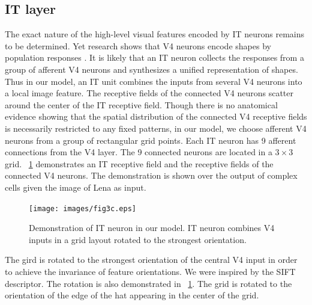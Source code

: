 \documentclass[5p]{elsarticle}
\begin{document}
\subsection{IT layer}

The exact nature of the high-level visual features 
encoded by IT neurons remains to be determined.
Yet research shows that V4 neurons encode shapes 
by population responses \cite{Pasupathy2002}.
It is likely that an IT neuron collects 
the responses from a group of afferent V4 neurons 
and synthesizes a unified representation of shapes.
Thus in our model,
an IT unit combines the inputs 
from several V4 neurons into a local image feature.
The receptive fields of the connected V4 neurons 
scatter around the center of the IT receptive field.
Though there is no anatomical evidence showing that 
the spatial distribution of the connected V4 receptive fields 
is necessarily restricted to any fixed patterns,
in our model, we choose afferent V4 neurons
from a group of rectangular grid points.
Each IT neuron has 9 afferent connections from the V4 layer.
The 9 connected neurons are located in a $3\times 3$ grid.
\figurename~\ref{fig:it} demonstrates an IT receptive field 
and the receptive fields of the connected V4 neurons.
The demonstration is shown over
the output of complex cells given the image of Lena as input.

\begin{figure}[h]
\centering
\texttt{[image: images/fig3c.eps]}
\caption{Demonstration of IT neuron in our model. 
IT neuron combines V4 inputs in a grid layout rotated to the strongest orientation.}
\label{fig:it}
\end{figure}

The gird is rotated to the strongest orientation 
of the central V4 input 
in order to achieve the invariance of feature orientations.
We were inspired by the SIFT \cite{Lowe1999} descriptor.
The rotation is also demonstrated in \figurename~\ref{fig:it}.
The grid is rotated to the orientation of the edge of the hat
appearing in the center of the grid.
\end{document}
